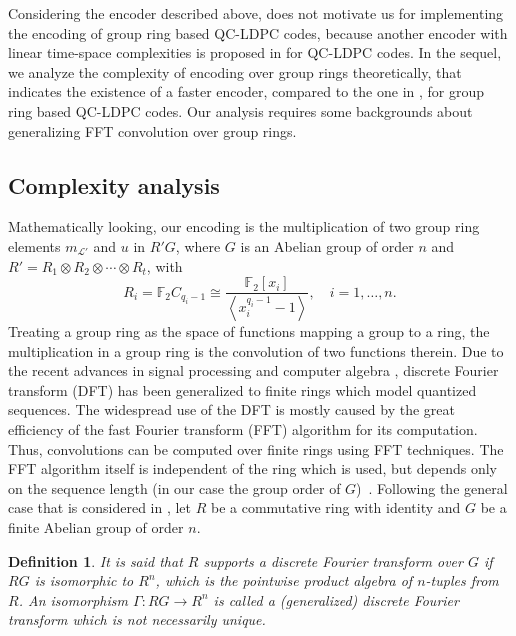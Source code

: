 \documentclass[journal,draftclsnofoot,onecolumn,12pt,twoside]{IEEEtran}
\newtheorem{Definition}{Definition}
\begin{document}
Considering the  encoder described above, does not motivate us for implementing the encoding of group ring based QC-LDPC codes, because another encoder with linear time-space complexities  is proposed  in \cite{4} for QC-LDPC codes. In the sequel, we analyze the complexity of  encoding over group rings theoretically, that indicates the existence of a faster encoder, compared to the one in \cite{4},  for group ring based QC-LDPC codes. Our analysis requires some backgrounds about generalizing FFT convolution over group rings.
\subsection{Complexity analysis}
Mathematically looking, our encoding is the multiplication of two group ring elements $m_{\mathcal{L}'}$ and $u$ in $R'G$, where $G$ is an Abelian group of order $n$ and $R'=R_1\otimes R_2\otimes \cdots \otimes  R_t$, with
\begin{equation}
R_i=\mathbb{F}_2C_{q_i-1}\cong\frac{\mathbb{F}_2[x_i]}{\left\langle x_i^{q_i-1}-1\right\rangle},\quad i=1,\ldots,n.
\end{equation}
Treating a group ring as the space of functions mapping a group to a ring, the  multiplication in a group ring is the convolution of two functions therein. Due to the recent advances in signal processing and computer algebra \cite{group_ring_FFT}, discrete Fourier transform (DFT) has been generalized to finite rings which model quantized sequences. The widespread use of the
DFT is mostly caused by the great efficiency of the fast Fourier transform (FFT) algorithm for its computation. Thus, convolutions
can be computed over finite rings using FFT techniques. The FFT algorithm itself is independent of the ring which is used, but depends only on
the sequence length (in our case the group order of $G$)~\cite{group_ring_FFT}. Following the general case that is considered in \cite{group_ring_FFT}, let $R$ be a commutative ring with identity and $G$ be a finite
Abelian group of order $n$.
\begin{Definition}
It is said that $R$ supports a discrete Fourier transform over $G$ if $RG$ is isomorphic to $R^n$, which is the pointwise product algebra of $n$-tuples from $R$. An isomorphism $\Gamma: RG\rightarrow R^n$  is called a (generalized) discrete Fourier transform which is not necessarily
unique.
\end{Definition}
\end{document}

